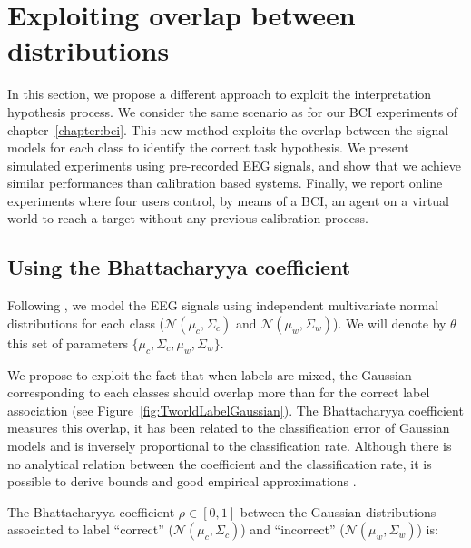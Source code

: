 
\section{Exploiting overlap between distributions}
\label{chapter:limitations:overlap}

In this section, we propose a different approach to exploit the interpretation hypothesis process. We consider the same scenario as for our BCI experiments of chapter~\ref{chapter:bci}. This new method exploits the overlap between the signal models for each class to identify the correct task hypothesis. We present simulated experiments using pre-recorded EEG signals, and show that we achieve similar performances than calibration based systems. Finally, we report online experiments where four users control, by means of a BCI, an agent on a virtual world to reach a target without any previous calibration process.


\subsection{Using the Bhattacharyya coefficient}

Following \cite{lotte2007review,blankertz2010single}, we model the EEG signals using independent multivariate normal distributions for each class ($\mathcal{N}(\mu_c, \Sigma_c)$ and $\mathcal{N}(\mu_w, \Sigma_w)$). We will denote by $\theta$ this set of parameters $\{\mu_c, \Sigma_c,\mu_w, \Sigma_w\}$.

We propose to exploit the fact that when labels are mixed, the Gaussian corresponding to each classes should overlap more than for the correct label association (see Figure~\ref{fig:TworldLabelGaussian}). The Bhattacharyya coefficient measures this overlap, it has been related to the classification error of Gaussian models \cite{Kailath67} and is inversely proportional to the classification rate. Although there is no analytical relation between the coefficient and the classification rate, it is possible to derive bounds and good empirical approximations \cite{lee2000bayes}.

The Bhattacharyya coefficient $\rho \in [0,1]$ between the Gaussian distributions associated to label ``correct'' ($\mathcal{N}(\mu_c, \Sigma_c)$) and ``incorrect'' ($\mathcal{N}(\mu_w, \Sigma_w)$) is:

